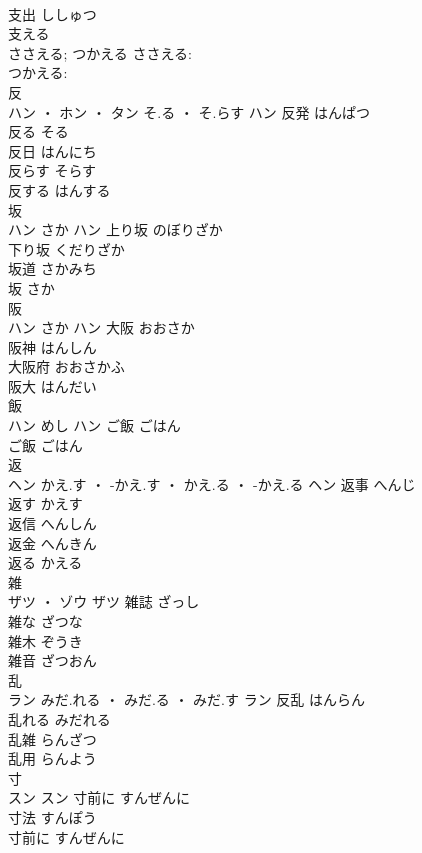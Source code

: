 \documentclass[8pt]{extreport}
\begin{document}
\begin{CJK}{UTF8}{min}
\\	支出	ししゅつ	
\\	支える 
\\	ささえる; つかえる	ささえる: 
\\	つかえる: 
\\	反	
\\	ハン ・ ホン ・ タン	そ.る ・ そ.らす	ハン	反発	はんぱつ	
\\	反る	そる	
\\	反日	はんにち	
\\	反らす	そらす	
\\	反する	はんする	
\\	坂	
\\	ハン	さか	ハン	上り坂	のぼりざか	
\\	下り坂	くだりざか	
\\	坂道	さかみち	
\\	坂	さか	
\\	阪	
\\	ハン	さか	ハン	大阪	おおさか	
\\	阪神	はんしん	
\\	大阪府	おおさかふ	
\\	阪大	はんだい	
\\	飯	
\\	ハン	めし	ハン	ご飯	ごはん	
\\	ご飯	ごはん	
\\	返	
\\	ヘン	かえ.す ・ -かえ.す ・ かえ.る ・ -かえ.る	ヘン	返事	へんじ	
\\	返す	かえす	
\\	返信	へんしん	
\\	返金	へんきん	
\\	返る	かえる	
\\	雑	
\\	ザツ ・ ゾウ		ザツ	雑誌	ざっし	
\\	雑な	ざつな	
\\	雑木	ぞうき	
\\	雑音	ざつおん	
\\	乱	
\\	ラン	みだ.れる ・ みだ.る ・ みだ.す	ラン	反乱	はんらん	
\\	乱れる	みだれる	
\\	乱雑	らんざつ	
\\	乱用	らんよう	
\\	寸	
\\	スン		スン	寸前に	すんぜんに	
\\	寸法	すんぽう	
\\	寸前に	すんぜんに	

\end{CJK}
\end{document}
